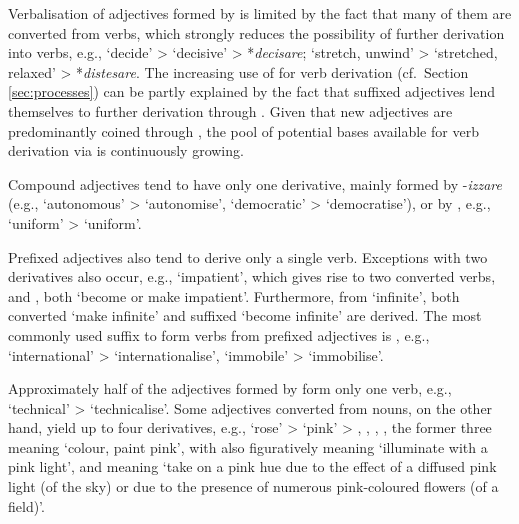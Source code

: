 \documentclass[output=paper,colorlinks,citecolor=brown]{langscibook}
\begin{document}
Verbalisation of adjectives formed by  is limited by the fact that many of them are converted from verbs, which strongly reduces the possibility of further derivation into verbs, e.g.,  ‘decide’ >  ‘decisive’ > \mbox{*\textit{decisare};}  ‘stretch, unwind’ >  ‘stretched, relaxed’ > *\textit{distesare}. The increasing use of  for verb derivation (cf.\ Section  \ref{sec:processes}) can be partly explained by the fact that suffixed adjectives lend themselves to further derivation through . Given that new adjectives are predominantly coined through , the pool of potential bases available for verb derivation via  is continuously growing.

Compound adjectives tend to have only one derivative, mainly formed by \nobreakdash-\textit{izzare}  (e.g.,  ‘autonomous’ >  ‘autonomise’,  ‘democratic’ >  ‘democratise’), or by  , e.g.,  ‘uniform’ >  ‘uniform’.

Prefixed adjectives also tend to derive only a single verb. Exceptions with two derivatives also occur, e.g.,  ‘impatient’, which gives rise to two converted verbs,  and , both ‘become or make impatient’. Furthermore, from  ‘infinite’, both converted  ‘make infinite’ and suffixed  ‘become infinite’ are derived. The most commonly used suffix to form verbs from prefixed adjectives is , e.g.,  ‘international’ >  ‘internationalise’,  ‘immobile’ > \mbox{} ‘immobilise’.

Approximately half of the adjectives formed by  form only one verb, e.g.,  ‘technical’ >  ‘technicalise’. Some adjectives converted from nouns, on the other hand, yield up to four derivatives, e.g.,  ‘rose’ >  ‘pink’ > , , , , the former three meaning ‘colour, paint pink’, with  also figuratively meaning ‘illuminate with a pink light’, and  meaning ‘take on a pink hue due to the effect of a diffused pink light (of the sky) or due to the presence of numerous pink-coloured flowers (of a field)’.
\end{document}

